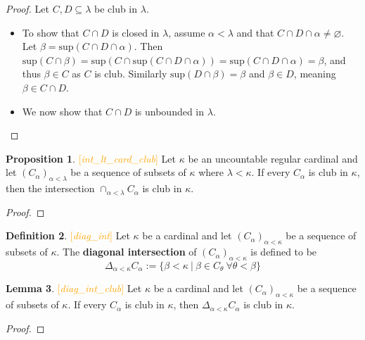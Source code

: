 \documentclass[11pt]{article}
\theoremstyle{definition}
\newtheorem{defin}{Definition}
\newtheorem{proposition}[defin]{Proposition}
\newtheorem{lem}[defin]{Lemma}
\begin{document}
\begin{proof}
    Let $C,D\subseteq\lambda$ be club in $\lambda$.
    \begin{itemize}
        \item To show that $C\cap D$ is closed in $\lambda$, assume $\alpha < \lambda$ and
        that $C\cap D\cap \alpha \neq\varnothing$. Let $\beta=\text{sup}(C\cap D\cap\alpha)$.
        Then $\text{sup}(C\cap \beta)=\text{sup}(C \cap \text{sup}(C\cap D\cap\alpha))
        = \text{sup}(C\cap D\cap\alpha) = \beta$, and thus $\beta\in C$ as $C$ is club.
        Similarly $\text{sup}(D\cap\beta)=\beta$ and $\beta\in D$, meaning $\beta\in C\cap D$.
        \item We now show that $C\cap D$ is unbounded in $\lambda$.
    \end{itemize}
\end{proof}

\begin{proposition}\label{inlt} \textcolor{orange}{[\textit{int\_lt\_card\_club}]}
    Let $\kappa$ be an uncountable regular cardinal and let $(C_\alpha)_{\alpha<\lambda}$ be a sequence of
    subsets of $\kappa$ where $\lambda < \kappa$. If every $C_\alpha$ is club in $\kappa$, then the
    intersection $\cap_{\alpha < \lambda}C_{\alpha}$ is club in $\kappa$.
\end{proposition}

\begin{proof}

\end{proof}

\begin{defin}\textcolor{orange}{[\textit{diag\_int}]}
    Let $\kappa$ be a cardinal and let $(C_\alpha)_{\alpha <\kappa}$ be a sequence of subsets of
    $\kappa$. The \textbf{diagonal intersection} of $(C_\alpha)_{\alpha <\kappa}$ is defined to be
    $$\Delta_{\alpha<\kappa}C_\alpha:=\{\beta <\kappa\ |\ \beta \in C_{\theta}\ \forall\theta<\beta\}$$
\end{defin}

\begin{lem}\label{diagint} \textcolor{orange}{[\textit{diag\_int\_club}]}
    Let $\kappa$ be a cardinal and let $(C_\alpha)_{\alpha <\kappa}$ be a sequence of subsets of
    $\kappa$. If every $C_{\alpha}$ is club in $\kappa$, then $\Delta_{\alpha<\kappa}C_\alpha$ is club in
    $\kappa$.
\end{lem}

\begin{proof}

\end{proof}
\end{document}
